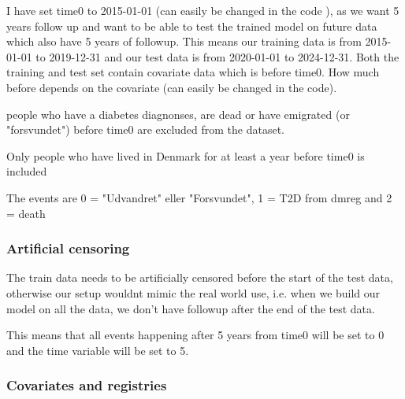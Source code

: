 \documentclass[11pt]{article}
\begin{document}
I have set time0 to 2015-01-01 (can easily be changed in the code ), as we want 5 years follow up and want to be able to test the trained model on future data which also have 5 years of followup. This means our training data is from 2015-01-01 to 2019-12-31 and our test data is from 2020-01-01 to 2024-12-31. Both the training and test set contain covariate data which is before time0. How much before depends on the covariate (can easily be changed in the code).

people who have a diabetes diagnonses, are dead or have emigrated (or "forsvundet") before time0 are excluded from the dataset.

Only people who have lived in Denmark for at least a year before time0 is included

The events are 0 = "Udvandret" eller "Forsvundet", 1 = T2D from dmreg and 2 = death

\subsubsection{Artificial censoring}
\label{sec:org74cea6a}

The train data needs to be artificially censored before the start of the test data, otherwise our setup wouldnt mimic the real world use, i.e. when we build our model on all the data, we don't have followup after the end of the test data.

This means that all events happening after 5 years from time0 will be set to 0 and the time variable will be set to 5.

\subsubsection{Covariates and registries}
\label{sec:orgcec5276}
\end{document}
